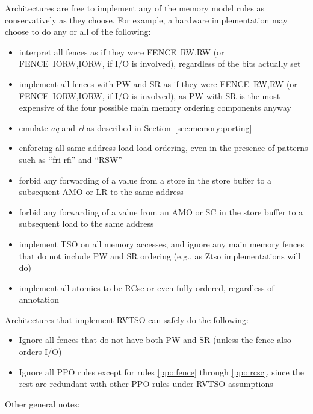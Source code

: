 Architectures are free to implement any of the memory model rules as conservatively as they choose.  For example, a hardware implementation may choose to do any or all of the following:
  \begin{itemize}
    \item interpret all fences as if they were FENCE~RW,RW (or FENCE~IORW,IORW, if I/O is involved), regardless of the bits actually set
    \item implement all fences with PW and SR as if they were FENCE~RW,RW (or FENCE~IORW,IORW, if I/O is involved), as PW with SR is the most expensive of the four possible main memory ordering components anyway
    \item emulate {\em aq} and {\em rl} as described in Section~\ref{sec:memory:porting}
    \item enforcing all same-address load-load ordering, even in the presence of patterns such as ``fri-rfi'' and ``RSW''
    \item forbid any forwarding of a value from a store in the store buffer to a subsequent AMO or LR to the same address
    \item forbid any forwarding of a value from an AMO or SC in the store buffer to a subsequent load to the same address
    \item implement TSO on all memory accesses, and ignore any main memory fences that do not include PW and SR ordering (e.g., as Ztso implementations will do)
    \item implement all atomics to be RCsc or even fully ordered, regardless of annotation
  \end{itemize}

Architectures that implement RVTSO can safely do the following:
\begin{itemize}
  \item Ignore all fences that do not have both PW and SR (unless the fence also orders I/O)
  \item Ignore all PPO rules except for rules \ref{ppo:fence} through \ref{ppo:rcsc}, since the rest are redundant with other PPO rules under RVTSO assumptions
\end{itemize}

Other general notes:

